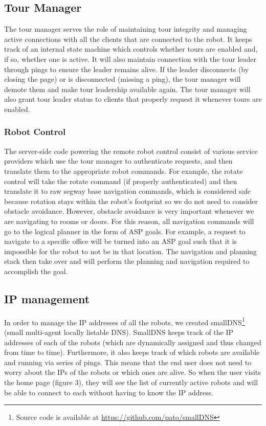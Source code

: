 \documentclass[
  oneside,
  11pt, a4paper,
  footinclude=true,
  headinclude=true,
  cleardoublepage=empty
]{article}
\begin{document}
\subsection{Tour Manager}

The tour manager serves the role of maintaining tour integrity and managing
active connections with all the clients that are connected to the robot. It
keeps track of an internal state machine which controls whether tours are
enabled and, if so, whether one is active. It will also maintain connection
with the tour leader through pings to ensure the leader remains alive. If the
leader disconnects (by closing the page) or is disconnected (missing a ping),
the tour manager will demote them and make tour leadership available again. The
tour manager will also grant tour leader status to clients that properly
request it whenever tours are enabled.

\subsubsection{Robot Control}

The server-side code powering the remote robot control consist of various
service providers which use the tour manager to authenticate requests, and then
translate them to the appropriate robot commands. For example, the rotate control
will take the rotate command (if properly authenticated) and then translate it
to raw segway base navigation commands, which is considered safe because
rotation stays within the robot's footprint so we do not need to consider
obstacle avoidance. However, obstacle avoidance is very important whenever we
are navigating to rooms or doors. For this reason, all navigation commands will
go to the logical planner in the form of ASP goals. For example, a request to
navigate to a specific office will be turned into an ASP goal such that it is
impossible for the robot to not be in that location. The navigation and
planning stack then take over and will perform the planning and navigation
required to accomplish the goal.

\subsection{IP management}

In order to manage the IP addresses of all the robots, we created
smallDNS\footnote{Source code is available at
\url{https://github.com/pato/smallDNS}} (small multi-agent locally listable
DNS). SmallDNS keeps track of the IP addresses of each of the robots (which are
dynamically assigned and thus changed from time to time). Furthermore, it also
keeps track of which robots are available and running via series of pings. This
means that the end user does not need to worry about the IPs of the robots or
which ones are alive. So when the user visits the home page (figure 3), they
will see the list of currently active robots and will be able to connect to
each without having to know the IP address.
\end{document}
